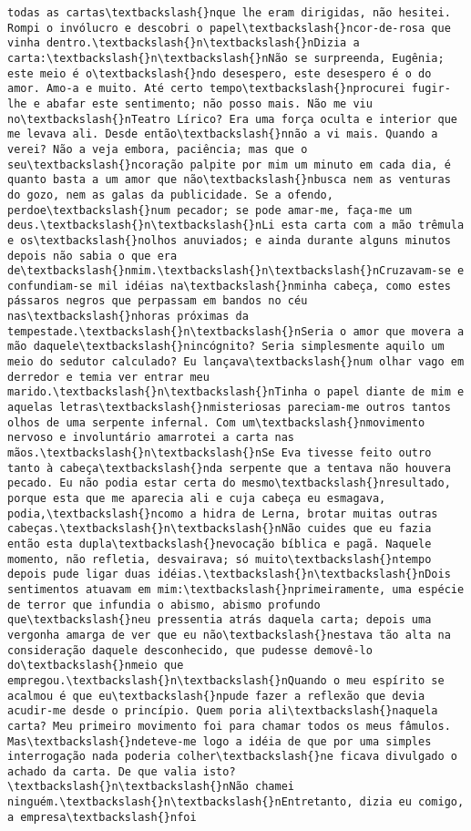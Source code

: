 \documentclass[11pt]{article}
\begin{document}
\begin{Verbatim}[commandchars=\\\{\}]
todas as cartas\textbackslash{}nque lhe eram dirigidas, não hesitei. Rompi o invólucro e descobri o papel\textbackslash{}ncor-de-rosa que vinha dentro.\textbackslash{}n\textbackslash{}nDizia a carta:\textbackslash{}n\textbackslash{}nNão se surpreenda, Eugênia; este meio é o\textbackslash{}ndo desespero, este desespero é o do amor. Amo-a e muito. Até certo tempo\textbackslash{}nprocurei fugir-lhe e abafar este sentimento; não posso mais. Não me viu no\textbackslash{}nTeatro Lírico? Era uma força oculta e interior que me levava ali. Desde então\textbackslash{}nnão a vi mais. Quando a verei? Não a veja embora, paciência; mas que o seu\textbackslash{}ncoração palpite por mim um minuto em cada dia, é quanto basta a um amor que não\textbackslash{}nbusca nem as venturas do gozo, nem as galas da publicidade. Se a ofendo, perdoe\textbackslash{}num pecador; se pode amar-me, faça-me um deus.\textbackslash{}n\textbackslash{}nLi esta carta com a mão trêmula e os\textbackslash{}nolhos anuviados; e ainda durante alguns minutos depois não sabia o que era de\textbackslash{}nmim.\textbackslash{}n\textbackslash{}nCruzavam-se e confundiam-se mil idéias na\textbackslash{}nminha cabeça, como estes pássaros negros que perpassam em bandos no céu nas\textbackslash{}nhoras próximas da tempestade.\textbackslash{}n\textbackslash{}nSeria o amor que movera a mão daquele\textbackslash{}nincógnito? Seria simplesmente aquilo um meio do sedutor calculado? Eu lançava\textbackslash{}num olhar vago em derredor e temia ver entrar meu marido.\textbackslash{}n\textbackslash{}nTinha o papel diante de mim e aquelas letras\textbackslash{}nmisteriosas pareciam-me outros tantos olhos de uma serpente infernal. Com um\textbackslash{}nmovimento nervoso e involuntário amarrotei a carta nas mãos.\textbackslash{}n\textbackslash{}nSe Eva tivesse feito outro tanto à cabeça\textbackslash{}nda serpente que a tentava não houvera pecado. Eu não podia estar certa do mesmo\textbackslash{}nresultado, porque esta que me aparecia ali e cuja cabeça eu esmagava, podia,\textbackslash{}ncomo a hidra de Lerna, brotar muitas outras cabeças.\textbackslash{}n\textbackslash{}nNão cuides que eu fazia então esta dupla\textbackslash{}nevocação bíblica e pagã. Naquele momento, não refletia, desvairava; só muito\textbackslash{}ntempo depois pude ligar duas idéias.\textbackslash{}n\textbackslash{}nDois sentimentos atuavam em mim:\textbackslash{}nprimeiramente, uma espécie de terror que infundia o abismo, abismo profundo que\textbackslash{}neu pressentia atrás daquela carta; depois uma vergonha amarga de ver que eu não\textbackslash{}nestava tão alta na consideração daquele desconhecido, que pudesse demovê-lo do\textbackslash{}nmeio que empregou.\textbackslash{}n\textbackslash{}nQuando o meu espírito se acalmou é que eu\textbackslash{}npude fazer a reflexão que devia acudir-me desde o princípio. Quem poria ali\textbackslash{}naquela carta? Meu primeiro movimento foi para chamar todos os meus fâmulos. Mas\textbackslash{}ndeteve-me logo a idéia de que por uma simples interrogação nada poderia colher\textbackslash{}ne ficava divulgado o achado da carta. De que valia isto?\textbackslash{}n\textbackslash{}nNão chamei ninguém.\textbackslash{}n\textbackslash{}nEntretanto, dizia eu comigo, a empresa\textbackslash{}nfoi 
\end{Verbatim}
\end{document}
